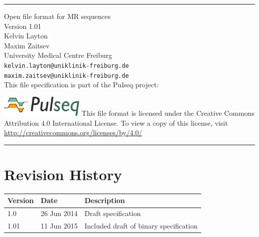 \documentclass{article}
\date{}
\author{}
\def\myversion{1.01 }
\begin{document}
\begin{titlepage}
\begin{centering}
\rule{\textwidth}{5pt}\vskip1cm
\Huge{Open file format for MR sequences \\}
\vspace{1cm}
\LARGE{Version \myversion\\}
\vspace{1cm}
\large Kelvin Layton\\ Maxim Zaitsev\\
\vspace{1cm}
\large University Medical Centre Freiburg \\%
 \verb+kelvin.layton@uniklinik-freiburg.de+\\%
 \verb+maxim.zaitsev@uniklinik-freiburg.de+\\%
 \vspace{1cm}
 This file specification is part of the Pulseq project:
 \vspace{0.5cm}

 \href{http://pulseq.github.io/}{\includegraphics[width=0.3\textwidth]{logo}}
 \vfill
\small This file format is licensed under the Creative Commons Attribution 4.0 International License. To view a copy of this license, visit \url{ http://creativecommons.org/licenses/by/4.0/ }\\
\rule{\textwidth}{5pt}
\end{centering}
\end{titlepage}

\newpage

\setlength\parindent{0pt}
\setlength{\parskip}{0.4\baselineskip}%

\tableofcontents

\setlength\parindent{0pt}
\setlength{\parskip}{\baselineskip}%

\newpage
\section*{Revision History}
\begin{tabular}{lll}
\toprule
Version & Date & Description \\
\midrule
1.0 & 26 Jun 2014 & Draft specification \\
1.01 & 11 Jun 2015 & Included draft of binary specification \\
\bottomrule
\end{tabular}
\end{document}

